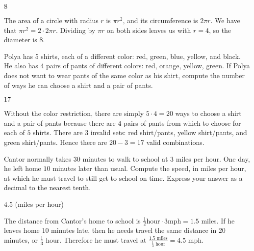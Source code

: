 \documentclass[11pt]{article}
\begin{document}
\begin{answer}
$\boxed{8}$
\end{answer}

\begin{solution}
The area of a circle with radius $r$ is $\pi r^2$, and its circumference is $2\pi r$. We have that $\pi r^2 = 2 \cdot 2\pi r$. Dividing by $\pi r$ on both sides leaves us with $r = 4$, so the diameter is $\boxed{8}$.
\end{solution}


\begin{problem}
Polya has 5 shirts, each of a different color: red, green, blue, yellow, and black. He also has 4 pairs of pants of different colors: red, orange, yellow, green. If Polya does not want to wear pants of the same color as his shirt, compute the number of ways he can choose a shirt and a pair of pants.
\end{problem}

\begin{answer}
$\boxed{17}$
\end{answer}

\begin{solution}
Without the color restriction, there are simply $5 \cdot 4 = 20$ ways to choose a shirt and a pair of pants because there are $4$ pairs of pants from which to choose for each of $5$ shirts. There are $3$ invalid sets: red shirt/pants, yellow shirt/pants, and green shirt/pants. Hence there are $20 - 3 = \boxed{17}$ valid combinations.
\end{solution}


\begin{problem}
Cantor normally takes $30$ minutes to walk to school at $3$ miles per hour. One day, he left home $10$ minutes later than usual. Compute the speed, in miles per hour, at which he must travel to still get to school on time. Express your answer as a decimal to the nearest tenth.
\end{problem}

\begin{answer}
$\boxed{4.5}$ (miles per hour)
\end{answer}

\begin{solution}
The distance from Cantor's home to school is $\frac{1}{2} \text{hour} \cdot 3 \text{mph} = 1.5$ miles. If he leaves home $10$ minutes late, then he needs travel the same distance in $20$ minutes, or $\frac{1}{3}$ hour. Therefore he must travel at $\frac{1.5 \text{ miles}}{\frac{1}{3} \text{ hour}} = \boxed{4.5}$ mph.
\end{solution}
\end{document}
